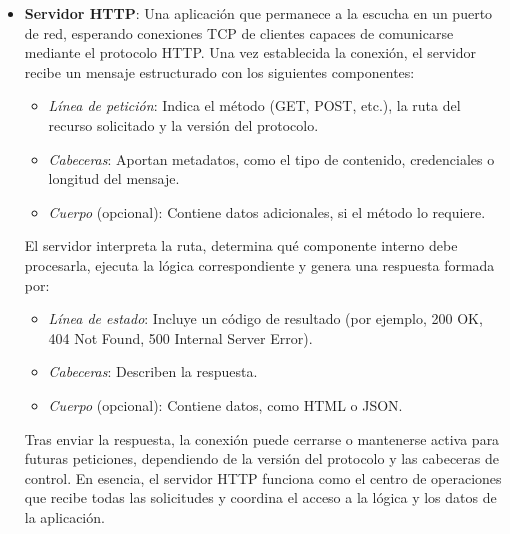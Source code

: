 \begin{itemize}
    \item \textbf{Servidor HTTP}: Una aplicación que permanece a la escucha en un puerto de red, esperando conexiones TCP de clientes capaces de comunicarse mediante el protocolo HTTP. Una vez establecida la conexión, el servidor recibe un mensaje estructurado con los siguientes componentes:
    \begin{itemize}
        \item \textit{Línea de petición}: Indica el método (GET, POST, etc.), la ruta del recurso solicitado y la versión del protocolo.
        \item \textit{Cabeceras}: Aportan metadatos, como el tipo de contenido, credenciales o longitud del mensaje.
        \item \textit{Cuerpo} (opcional): Contiene datos adicionales, si el método lo requiere.
    \end{itemize}
    El servidor interpreta la ruta, determina qué componente interno debe procesarla, ejecuta la lógica correspondiente y genera una respuesta formada por:
    \begin{itemize}
        \item \textit{Línea de estado}: Incluye un código de resultado (por ejemplo, 200 OK, 404 Not Found, 500 Internal Server Error).
        \item \textit{Cabeceras}: Describen la respuesta.
        \item \textit{Cuerpo} (opcional): Contiene datos, como HTML o JSON.
    \end{itemize}
    Tras enviar la respuesta, la conexión puede cerrarse o mantenerse activa para futuras peticiones, dependiendo de la versión del protocolo y las cabeceras de control. En esencia, el servidor HTTP funciona como el centro de operaciones que recibe todas las solicitudes y coordina el acceso a la lógica y los datos de la aplicación.


\end{itemize}
